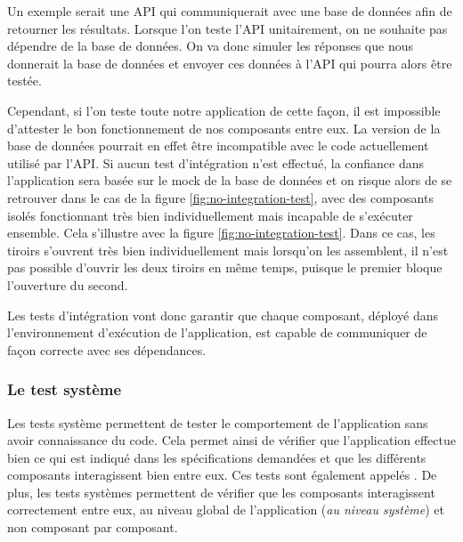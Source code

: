 Un exemple serait une \gls{API} qui communiquerait avec une base de données afin de retourner les résultats. Lorsque l'on teste l'\gls{API} unitairement, on ne souhaite pas dépendre de la base de données. On va donc simuler les réponses que nous donnerait la base de données et envoyer ces données à l'\gls{API} qui pourra alors être testée.

Cependant, si l'on teste toute notre application de cette façon, il est impossible d'attester le bon fonctionnement de nos composants entre eux. La version de la base de données pourrait en effet être incompatible avec le code actuellement utilisé par l'\gls{API}. Si aucun test d'intégration n'est effectué, la confiance dans l'application sera basée sur le \gls{mock} de la base de données et on risque alors de se retrouver dans le cas de la figure \ref{fig:no-integration-test}, avec des composants isolés fonctionnant très bien individuellement mais incapable de s'exécuter ensemble. Cela s'illustre avec la figure \ref{fig:no-integration-test}. Dans ce cas, les tiroirs s'ouvrent très bien individuellement mais lorsqu'on les assemblent, il n'est pas possible d'ouvrir les deux tiroirs en même temps, puisque le premier bloque l'ouverture du second.


Les tests d'intégration vont donc garantir que chaque composant, déployé dans l'environnement d'exécution de l'application, est capable de communiquer de façon correcte avec ses dépendances.

\subsubsection{Le test système}


Les tests système permettent de tester le comportement de l'application sans avoir connaissance du code. Cela permet ainsi de vérifier que l'application effectue bien ce qui est indiqué dans les spécifications demandées et que les différents composants interagissent bien entre eux. Ces tests sont également appelés . De plus, les tests systèmes permettent de vérifier que les composants interagissent correctement entre eux, au niveau global de l'application (\emph{au niveau système}) et non composant par composant.

